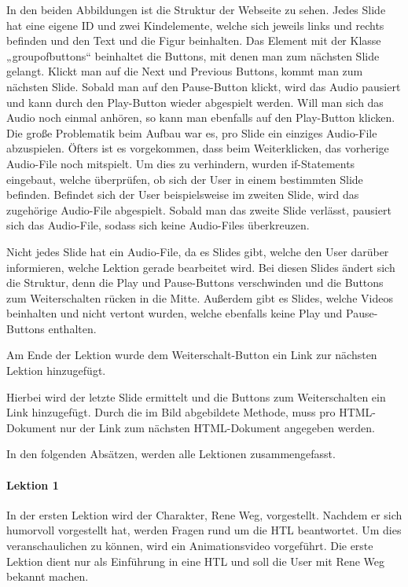 In den beiden Abbildungen ist die Struktur der Webseite zu sehen. Jedes Slide hat eine eigene ID und zwei Kindelemente, welche sich jeweils links und rechts befinden und den Text und die Figur beinhalten. Das Element mit der Klasse „groupofbuttons“ beinhaltet die Buttons, mit denen man zum nächsten Slide gelangt. Klickt man auf die Next und Previous Buttons, kommt man zum nächsten Slide. Sobald man auf den Pause-Button klickt, wird das Audio pausiert und kann durch den Play-Button wieder abgespielt werden. Will man sich das Audio noch einmal anhören, so kann man ebenfalls auf den Play-Button klicken. Die große Problematik beim Aufbau war es, pro Slide ein einziges Audio-File abzuspielen. Öfters ist es vorgekommen, dass beim Weiterklicken, das vorherige Audio-File noch mitspielt. Um dies zu verhindern, wurden if-Statements eingebaut, welche überprüfen, ob sich der User in einem bestimmten Slide befinden. Befindet sich der User beispielsweise im zweiten Slide, wird das zugehörige Audio-File abgespielt. Sobald man das zweite Slide verlässt, pausiert sich das Audio-File, sodass sich keine Audio-Files überkreuzen. 



Nicht jedes Slide hat ein Audio-File, da es Slides gibt, welche den User darüber informieren, welche Lektion gerade bearbeitet wird. Bei diesen Slides ändert sich die Struktur, denn die Play und Pause-Buttons verschwinden und die Buttons zum Weiterschalten rücken in die Mitte. Außerdem gibt es Slides, welche Videos beinhalten und nicht vertont wurden, welche ebenfalls keine Play und Pause-Buttons enthalten. 

 

Am Ende der Lektion wurde dem Weiterschalt-Button ein Link zur nächsten Lektion hinzugefügt. 

 

Hierbei wird der letzte Slide ermittelt und die Buttons zum Weiterschalten ein Link hinzugefügt. Durch die im Bild abgebildete Methode, muss pro HTML-Dokument nur der Link zum nächsten HTML-Dokument angegeben werden. 


In den folgenden Absätzen, werden alle Lektionen zusammengefasst.
\paragraph{Lektion 1}
In der ersten Lektion wird der Charakter, Rene Weg, vorgestellt. Nachdem er sich humorvoll vorgestellt hat, werden Fragen rund um die HTL beantwortet. Um dies veranschaulichen zu können, wird ein Animationsvideo vorgeführt. Die erste Lektion dient nur als Einführung in eine HTL und soll die User mit Rene Weg bekannt machen. 


